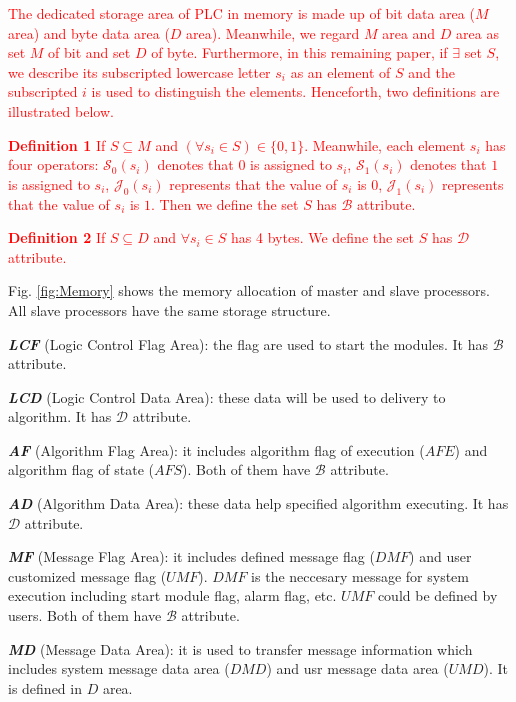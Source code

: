 \documentclass[journal,UTF8]{IEEEtran}
\begin{document}
\textcolor{red}{The dedicated storage area of PLC in memory is made up of bit data area ($M$ area) and byte data area ($D$ area). Meanwhile, we regard $M$ area and $D$ area as set $M$ of bit and set $D$ of byte. Furthermore, in this remaining paper, if $\exists$ set $S$, we describe its subscripted lowercase letter $s_i$ as an element of $S$ and the subscripted $i$ is used to distinguish the elements. Henceforth, two definitions are illustrated below.}

\textcolor{red}{\textbf{Definition 1} If $ S \subseteq M$ and $(\forall s_{i} \in S) \in \{0, 1\} $. Meanwhile, each element $s_i$ has four operators: $\mathcal{S}_0(s_i)$ denotes that $0$ is assigned to $s_i$, $\mathcal{S}_1(s_i)$ denotes that $1$ is assigned to $s_i$, $\mathcal{J}_0(s_i)$ represents that the value of $s_i$ is $0$, $\mathcal{J}_1(s_i)$ represents that the value of $s_i$ is $1$. Then we define the set $S$ has $\mathcal{B}$ attribute.}

\textcolor{red}{\textbf{Definition 2} If $ S \subseteq D$ and $\forall s_{i} \in S$ has 4 bytes. We define the set $S$ has $\mathcal{D}$ attribute.}





Fig. \ref{fig:Memory} shows the memory allocation of master and slave processors. All slave processors have the same storage structure.

\textbf{\emph{LCF}} (Logic Control Flag Area): the flag are used to start the modules. It has $\mathcal{B}$ attribute.

\textbf{\emph{LCD}} (Logic Control Data Area): these data will be used to delivery to algorithm. It has $\mathcal{D}$ attribute.

\textbf{\emph{AF}} (Algorithm Flag Area): it includes algorithm flag of execution ($AFE$) and algorithm flag of state ($AFS$).
Both of them have $\mathcal{B}$ attribute.

\textbf{\emph{AD}} (Algorithm Data Area): these data help specified algorithm executing. It has $\mathcal{D}$ attribute.

\textbf{\emph{MF}} (Message Flag Area): it includes defined message flag ($DMF$) and user customized message flag ($UMF$). $DMF$ is the neccesary message for system execution including start module flag, alarm flag, etc. $UMF$ could be defined by users. Both of them have $\mathcal{B}$ attribute.

\textbf{\emph{MD}} (Message Data Area): it is used to transfer message information which includes system message data area ($DMD$) and usr message data area ($UMD$). It is defined in $D$ area.
\end{document}

